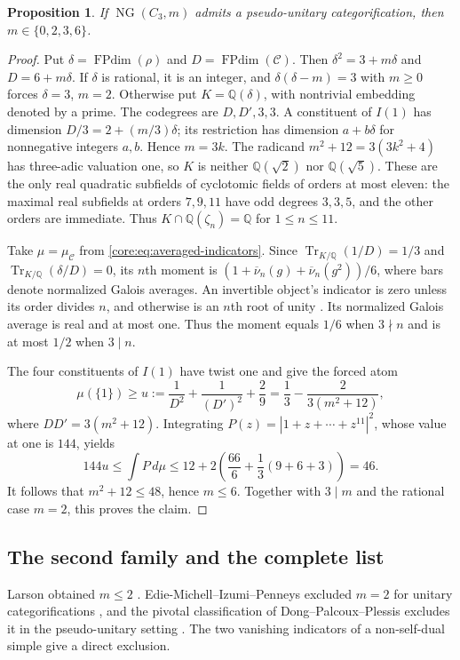 \documentclass[11pt,a4paper]{article}
\newtheorem{proposition}[theorem]{Proposition}
\theoremstyle{definition}\newtheorem{definition}[theorem]{Definition}
\theoremstyle{remark}\newtheorem{remark}[theorem]{Remark}
\DeclareMathOperator{\Tr}{Tr}
\newcommand{\C}{\mathcal C}
\newcommand{\Q}{\mathbb Q}
\numberwithin{equation}{section}
\begin{document}
\begin{proposition}\label{nsnew:near-group}
If $\operatorname{NG}(C_3,m)$ admits a pseudo-unitary categorification,
then $m\in\{0,2,3,6\}$.
\end{proposition}
\begin{proof}
Put $\delta=\operatorname{FPdim}(\rho)$ and $D=\operatorname{FPdim}(\C)$.
Then $\delta^2=3+m\delta$ and $D=6+m\delta$.
If $\delta$ is rational, it is an integer, and
$\delta(\delta-m)=3$ with $m\ge0$ forces $\delta=3$, $m=2$.
Otherwise put $K=\Q(\delta)$, with nontrivial embedding denoted by a
prime. The codegrees are $D,D',3,3$. A constituent of $I(1)$ has
dimension $D/3=2+(m/3)\delta$; its restriction has dimension
$a+b\delta$ for nonnegative integers $a,b$. Hence $m=3k$.
The radicand $m^2+12=3(3k^2+4)$ has three-adic valuation one, so
$K$ is neither $\Q(\sqrt2)$ nor $\Q(\sqrt5)$. These are the only
real quadratic subfields of cyclotomic fields of orders at most eleven:
the maximal real subfields at orders $7,9,11$ have odd degrees $3,3,5$,
and the other orders are immediate. Thus
$K\cap\Q(\zeta_n)=\Q$ for $1\le n\le11$.

Take $\mu=\mu_{\C}$ from \eqref{core:eq:averaged-indicators}.
Since $\Tr_{K/\Q}(1/D)=1/3$ and $\Tr_{K/\Q}(\delta/D)=0$, its
$n$th moment is
$(1+\overline\nu_n(g)+\overline\nu_n(g^2))/6$, where bars denote
normalized Galois averages. An invertible object's indicator is zero
unless its order divides $n$, and otherwise is an $n$th root of unity
\cite[Lemma~3.7]{Schopieray}. Its normalized Galois average is real
and at most one. Thus the moment equals $1/6$ when $3\nmid n$
and is at most $1/2$ when $3\mid n$.

The four constituents of $I(1)$ have twist one and give the forced atom
\[
 \mu(\{1\})\ge u:=\frac1{D^2}+\frac1{(D')^2}+\frac29
 =\frac13-\frac2{3(m^2+12)},
\]
where $DD'=3(m^2+12)$. Integrating
$P(z)=|1+z+\cdots+z^{11}|^2$, whose value at one is $144$, yields
\[
 144u\le\int P\,d\mu
 \le12+2\left(\frac{66}{6}+\frac13(9+6+3)\right)=46.
\]
It follows that $m^2+12\le48$, hence $m\le6$. Together with
$3\mid m$ and the rational case $m=2$, this proves the claim.
\end{proof}

\subsection{The second family and the complete list}

Larson obtained $m\le2$ \cite[Theorem~5.8]{Larson}.
Edie-Michell--Izumi--Penneys excluded $m=2$ for unitary
categorifications \cite{EIP}, and the pivotal classification of
Dong--Palcoux--Plessis excludes it in the pseudo-unitary setting
\cite{DPP}. The two vanishing indicators of a non-self-dual simple
give a direct exclusion.
\end{document}
